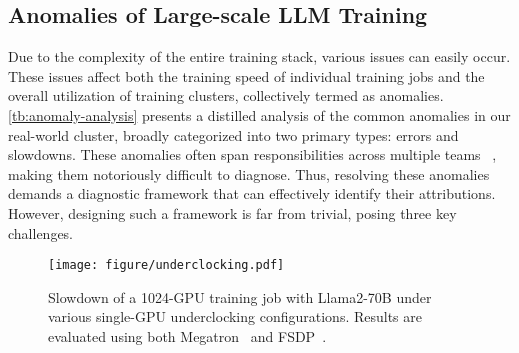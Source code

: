 \subsection{Anomalies of Large-scale LLM Training}
\label{sec:anomalies}

Due to the complexity of the entire training stack, various issues can easily occur.
These issues affect both the training speed of individual training jobs and the overall utilization of training clusters, collectively termed as anomalies.
\autoref{tb:anomaly-analysis} presents a distilled analysis of the common anomalies in our real-world cluster, broadly categorized into two primary types: errors and slowdowns.
These anomalies often span responsibilities across multiple teams ~\cite{jiangMegaScaleScaling,dongBoostingLargescale,wuFALCONPinpointing}, making them notoriously difficult to diagnose.
Thus, resolving these anomalies demands a diagnostic framework that can effectively identify their attributions. However, designing such a framework is far from trivial, posing three key challenges.

\begin{figure}
    \centering
    \texttt{[image: figure/underclocking.pdf]}
    \caption{Slowdown of a 1024-GPU training job with Llama2-70B under various single-GPU underclocking configurations. Results are evaluated using both Megatron~\cite{shoeybiMegatronLMTraining} and FSDP~\cite{zhaoPyTorchFSDP}.}
    \label{fig:frequency}
    \vspace{-4mm}
\end{figure}


